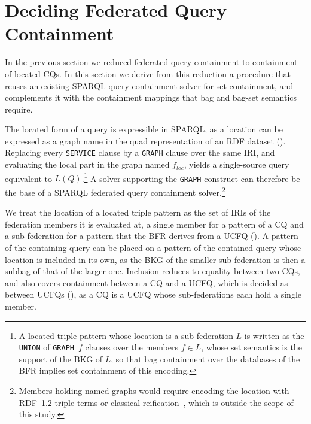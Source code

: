 \section{Deciding Federated Query Containment}\label{sec:resolution}

In the previous section we reduced federated query containment to containment of located \acp{CQ}.
In this section we derive from this reduction a procedure that reuses an existing SPARQL query containment solver for set containment, and complements it with the containment mappings that bag and bag-set semantics require.

The located form of a query is expressible in SPARQL, as a location can be expressed as a graph name in the quad representation of an \ac{RDF} dataset ().
Replacing every \texttt{SERVICE} clause by a \texttt{GRAPH} clause over the same \ac{IRI}, and evaluating the local part in the graph named $f_{\mathit{loc}}$, yields a single-source query equivalent to $L(Q)$.\footnote{A located triple pattern whose location is a sub-federation $L$ is written as the \texttt{UNION} of \texttt{GRAPH}~$f$ clauses over the members $f \in L$, whose set semantics is the support of the \ac{BKG} of $L$, so that bag containment over the databases of the \ac{BFR} implies set containment of this encoding.}
A solver supporting the \texttt{GRAPH} construct can therefore be the base of a SPARQL federated query containment solver.\footnote{Members holding named graphs would require encoding the location with \ac{RDF}~1.2 triple terms or classical reification~\cite{w3ConceptsAbstract}, which is outside the scope of this study.}

\begin{remark}\label{rem_location_inclusion}
We treat the location of a located triple pattern as the set of \acp{IRI} of the federation members it is evaluated at, a single member for a pattern of a \ac{CQ} and a sub-federation for a pattern that the \ac{BFR} derives from a \ac{UCFQ} ().
A pattern of the containing query can be placed on a pattern of the contained query whose location is included in its own, as the \ac{BKG} of the smaller sub-federation is then a subbag of that of the larger one.
Inclusion reduces to equality between two \acp{CQ}, and also covers containment between a \ac{CQ} and a \ac{UCFQ}, which is decided as between \acp{UCFQ} (), as a \ac{CQ} is a \ac{UCFQ} whose sub-federations each hold a single member.
\end{remark}

